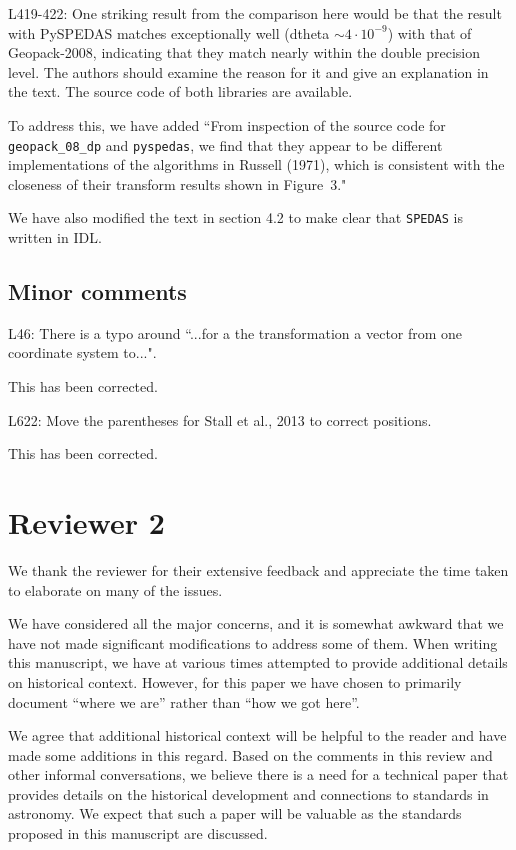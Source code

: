 \documentclass[11pt]{article}
\begin{document}
L419-422: One striking result from the comparison here would be that the result with PySPEDAS matches exceptionally well (dtheta $\sim 4\cdot 10^{-9}$) with that of Geopack-2008, indicating that they match nearly within the double precision level. The authors should examine the reason for it and give an explanation in the text. The source code of both libraries are available.
\\
{\color{violet}
\begin{leftbar}
To address this, we have added ``From inspection of the source code for \texttt{geopack\_08\_dp} and \texttt{pyspedas}, we find that they appear to be different implementations of the algorithms in Russell (1971), which is consistent with the closeness of their transform results shown in Figure~3."

We have also modified the text in section 4.2 to make clear that \texttt{SPEDAS} is written in IDL.
\end{leftbar}
}

\subsection{Minor comments}

L46: There is a typo around ``...for a the transformation a vector from one coordinate system to...".
\\
{\color{violet}
\begin{leftbar}
This has been corrected.
\end{leftbar}
}
L622: Move the parentheses for Stall et al., 2013 to correct positions.
\\
{\color{violet}
\begin{leftbar}
This has been corrected.
\end{leftbar}
}

\pagebreak

\section{Reviewer 2}

{\color{violet}
\begin{leftbar}
We thank the reviewer for their extensive feedback and appreciate the time taken to elaborate on many of the issues.

We have considered all the major concerns, and it is somewhat awkward that we have not made significant modifications to address some of them. When writing this manuscript, we have at various times attempted to provide additional details on historical context. However, for this paper we have chosen to primarily document ``where we are'' rather than ``how we got here''.

We agree that additional historical context will be helpful to the reader and have made some additions in this regard. Based on the comments in this review and other informal conversations, we believe there is a need for a technical paper that provides details on the historical development and connections to standards in astronomy. We expect that such a paper will be valuable as the standards proposed in this manuscript are discussed. 

\end{leftbar}
}
\end{document}
